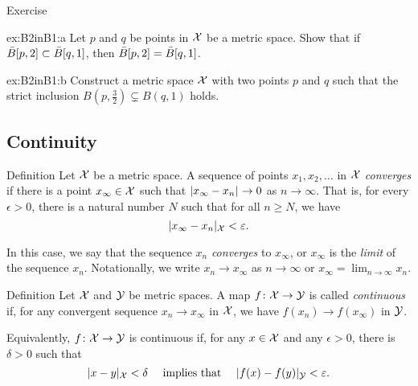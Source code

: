\begin{thm}{Exercise}\label{ex:B2inB1}

\begin{subthm}{ex:B2inB1:a}
Let $p$ and $q$ be points in $\mathcal{X}$ be a metric space.
Show that if $\bar B[p,2]\z\subset \bar B[q,1]$, then $\bar B[p,2]\z=\bar B[q,1]$.
\end{subthm}

\begin{subthm}{ex:B2inB1:b}
Construct a metric space $\mathcal{X}$ with two points $p$ and $q$ such that the strict inclusion
$B(p,\tfrac32)\subsetneq B(q,1)$ holds.
\end{subthm}

\end{thm}



\subsection*{Continuity}

\begin{thm}{Definition}
 Let ${\mathcal{X}}$ be a metric space.
A sequence of points $x_1, x_2, \ldots$ in ${\mathcal{X}}$ \emph{converges}
if there is a point
$x_\infty\in {\mathcal{X}}$ such that $\dist{x_\infty}{x_n}{}\to 0$ as $n\to\infty$.  
That is, for every $\epsilon > 0$, there is a natural number $N$ such that for all $n \ge N$, we have
\[
\dist{x_\infty}{x_n}{\spc{X}}
<
\epsilon.
\]

In this case, we say that the sequence $x_n$ {}\emph{converges} to $x_\infty$, 
or $x_\infty$ is the {}\emph{limit} of the sequence $x_n$.
Notationally, we write $x_n\to x_\infty$ as $n\to\infty$
or $x_\infty=\lim_{n\to\infty} x_n$.
\end{thm}

\begin{thm}{Definition}\label{def:continuous}
Let $\mathcal{X}$ and $\mathcal{Y}$ be metric spaces.
A map $f\colon\mathcal{X}\to \mathcal{Y}$ is called \emph{continuous} if, for any convergent sequence $x_n\to x_\infty$ in ${\mathcal{X}}$,
we have $f(x_n) \to f(x_\infty)$ in $\mathcal{Y}$.

Equivalently, $f\colon\mathcal{X}\to \mathcal{Y}$ is continuous if, for any $x\in {\mathcal{X}}$ and any $\epsilon>0$,
there is $\delta>0$ such that 
$$\dist{x}{y}{\spc{X}}<\delta\quad \text{ implies that }\quad \dist{f(x)}{f(y)}{\spc{Y}}<\epsilon.$$

\end{thm}

